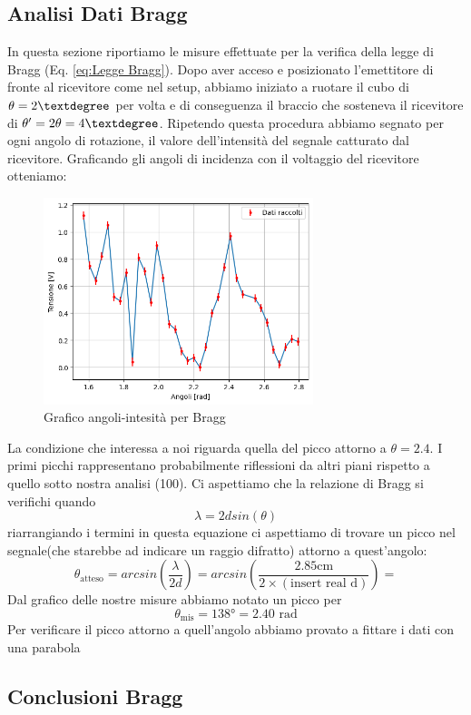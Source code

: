\documentclass[letterpaper,12pt]{article}
\begin{document}
\newpage
\subsection{Analisi Dati Bragg}
In questa sezione riportiamo le misure effettuate per la verifica della legge di Bragg (Eq. \ref{eq:Legge Bragg}). Dopo aver acceso e posizionato l'emettitore di fronte al ricevitore come nel setup, abbiamo iniziato a ruotare il cubo di $\theta = 2\textdegree$ per volta e di conseguenza il braccio che sosteneva il ricevitore di $\theta' = 2\theta = 4\textdegree$.
Ripetendo questa procedura abbiamo segnato per ogni angolo di rotazione, il valore dell'intensità del segnale catturato dal ricevitore.
Graficando gli angoli di incidenza con il voltaggio del ricevitore otteniamo:
\begin{figure}[h!]
	\centering
	\includegraphics[width = 0.7\textwidth]{Grafico1_bragg.png}
	\caption{Grafico angoli-intesità per Bragg}
	\label{fig:GraficoBragg}
\end{figure}
La condizione che interessa a noi riguarda quella del picco attorno a $\theta=2.4$. I primi picchi rappresentano probabilmente riflessioni da altri piani rispetto a quello sotto nostra analisi (100).
Ci aspettiamo che la relazione di Bragg si verifichi quando $$ \lambda = 2dsin(\theta) $$
riarrangiando i termini in questa equazione ci aspettiamo di trovare un picco nel segnale(che starebbe ad indicare un raggio difratto) attorno a quest'angolo:
$$ \theta_\text{atteso} = arcsin(\frac{\lambda}{2d}) = arcsin(\frac{2.85\text{cm}}{2\times(\text{insert real d})}) =  $$ 
Dal grafico delle nostre misure abbiamo notato un picco per $$\theta_\text{mis} = 138\text{°} = 2.40\text{ rad}$$
Per verificare il picco attorno a quell'angolo abbiamo provato a fittare i dati con una parabola


\subsection{Conclusioni Bragg}
\end{document}
